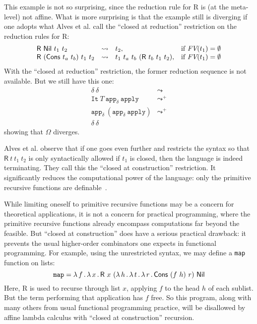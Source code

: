 \documentclass{article}
\begin{document}
This example is not so surprising, since the reduction rule for
\textsf{R} is (at the meta-level) not affine.  What is more surprising
is that the example still is diverging if one adopts what Alves et al.
call the ``closed at reduction'' restriction on the reduction
rules for \textsf{R}:
  \[
  \begin{array}{lllll}
    \mathsf{R}\ \mathsf{Nil}\ t_1\ t_2 & \leadsto & t_2, & \textnormal{if } \textit{FV}(t_1) = \emptyset\\
    \mathsf{R}\ (\mathsf{Cons}\ t_a\ t_b)\ t_1\ t_2 & \leadsto & t_1\ t_a\ t_b\ (\mathsf{R}\ t_b\ t_1\ t_2),& \textnormal{if } \textit{FV}(t_1) = \emptyset
  \end{array}
  \]
\noindent With the ``closed at reduction'' restriction, the former
reduction sequence is not available.  But we still have this one:
\[
\begin{array}{ll}
  \delta\ \delta & \leadsto \\
  \texttt{It}\ T\ \texttt{app}_\delta\ \texttt{apply} & \leadsto^+ \\
  \texttt{app}_\delta\ (\texttt{app}_\delta\ \texttt{apply}) & \leadsto^+ \\
  \delta\ \delta& \
\end{array}
\]
\noindent showing that $\Omega$ diverges.

Alves et al. observe that if one goes even further and restricts the
syntax so that $\mathsf{R}\ t\ t_1\ t_2$ is only syntactically allowed
if $t_1$ is closed, then the language is indeed terminating.  They
call this the ``closed at construction'' restriction.  It
significantly reduces the computational power of the language: only
the primitive recursive functions are definable~\cite{alves10}.

While limiting oneself to primitive recursive functions may be a
concern for theoretical applications, it is not a concern for
practical programming, where the primitive recursive functions already
encompass computations far beyond the feasible.  But ``closed at construction''
does have a serious practical drawback: it prevents the usual higher-order
combinators one expects in functional programming.  For example, using the
unrestricted syntax, we may define a \texttt{map} function on lists:
\[
\texttt{map} = \lam{f}{\lam{x}{\mathsf{R}\ x\ (\lam{h}{\lam{t}{\lam{r}{\mathsf{Cons}\ (f\ h)\ r}}})\ \mathsf{Nil}}}
\]
\noindent Here, \textsf{R} is used to recurse through list $x$,
applying $f$ to the head $h$ of each sublist.  But the term performing
that application has $f$ free.  So this program, along with many
others from usual functional programming practice, will be disallowed
by affine lambda calculus with ``closed at construction'' recursion.
\end{document}

